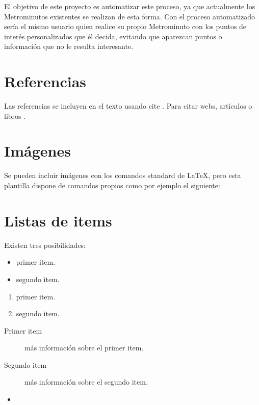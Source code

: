 El objetivo de este proyecto es automatizar este proceso, ya que actualmente los Metrominutos existentes se realizan de esta forma. Con el proceso automatizado sería el mismo usuario quien realice su propio Metrominuto con los puntos de interés personalizados que él decida, evitando que aparezcan puntos o información que no le resulta interesante.


\section{Referencias}

Las referencias se incluyen en el texto usando cite \cite{wiki:latex}. Para citar webs, artículos o libros \cite{koza92}.


\section{Imágenes}

Se pueden incluir imágenes con los comandos standard de \LaTeX, pero esta plantilla dispone de comandos propios como por ejemplo el siguiente:




\section{Listas de items}

Existen tres posibilidades:

\begin{itemize}
	\item primer item.
	\item segundo item.
\end{itemize}

\begin{enumerate}
	\item primer item.
	\item segundo item.
\end{enumerate}

\begin{description}
	\item[Primer item] más información sobre el primer item.
	\item[Segundo item] más información sobre el segundo item.
\end{description}
	
\begin{itemize}
\item 
\end{itemize}

